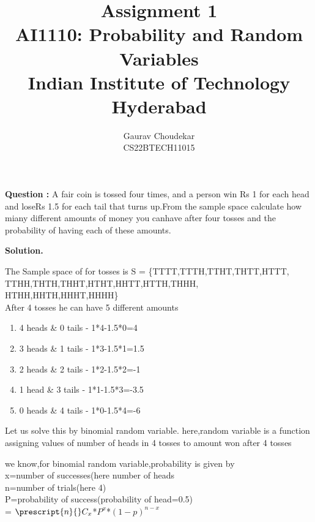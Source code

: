 \documentclass[journal,12pt,twocolumn]{IEEEtran}
\newcommand\Mycomb[2][^n]{\prescript{#1\mkern-0.5mu}{}C_{#2}}
\begin{document}
\let\vec\mathbf

\title{Assignment 1 \\ \Large AI1110: Probability and Random Variables \\ \Large Indian Institute of Technology Hyderabad}
\author{Gaurav Choudekar \\ \normalsize CS22BTECH11015}

        \maketitle	
	\textbf{Question :}
	A fair coin is tossed four times, and a person win  Rs 1 for each head and loseRs 1.5 for each tail that turns up.From the sample space calculate how miany different amounts of money you canhave after four tosses and the probability of having each of these amounts.
       
	\textbf{Solution.}

	The Sample space of for tosses is 
	S = \{TTTT,TTTH,TTHT,THTT,HTTT, TTHH,THTH,THHT,HTHT,HHTT,HTTH,THHH, HTHH,HHTH,HHHT,HHHH\}\\
	After 4 tosses he can have 5 different amounts
        \begin{enumerate}
	\item	4 heads \& 0 tails - 1*4-1.5*0=4
	\item	3 heads \& 1 tails - 1*3-1.5*1=1.5
	\item	2 heads \& 2 tails - 1*2-1.5*2=-1
	\item   1 head  \& 3 tails - 1*1-1.5*3=-3.5
	\item   0 heads \& 4 tails - 1*0-1.5*4=-6       
	\end{enumerate}

	Let us solve this by binomial random variable.
        here,random variable is a function assigning values of number of heads in 4 tosses to amount won after 4 tosses
       
        we know,for binomial random variable,probability is given by \\
        x=number of successes(here number of heads\\
        n=number of trials(here 4)\\
        P=probability of success(probability of head=0.5)\\
        = ${\Mycomb[n]{x}}$*${P^x}$*${{(1-p)}^{n-x}}$\\
        
\end{document}
